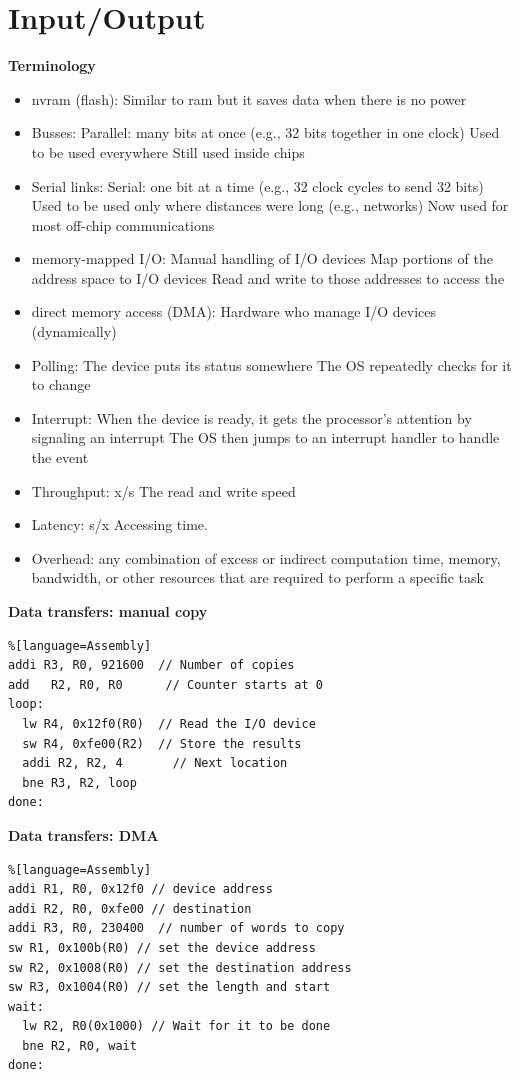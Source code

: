 \newpage
\section{Input/Output}

\textbf{Terminology}
\begin{itemize}
\item  nvram (flash): Similar to ram but it saves data when there is no power
\item  Busses:
  Parallel: many bits at once (e.g., 32 bits together in one clock)
  Used to be used everywhere
  Still used inside chips
\item  Serial links:
  Serial: one bit at a time (e.g., 32 clock cycles to send 32 bits)
  Used to be used only where distances were long (e.g., networks)
  Now used for most off-chip communications
\item  memory-mapped I/O:
  Manual handling of I/O devices
  Map portions of the address space to I/O devices
  Read and write to those addresses to access the 
\item  direct memory access (DMA):
  Hardware who manage I/O devices (dynamically)
\item  Polling:
  The device puts its status somewhere
  The OS repeatedly checks for it to change
\item  Interrupt:
  When the device is ready, it gets the processor’s attention by signaling an interrupt
  The OS then jumps to an interrupt handler to handle the event
\item  Throughput: x/s
  The read and write speed
\item  Latency: s/x
  Accessing time.
\item  Overhead:
  any combination of excess or 
  indirect computation time, memory, bandwidth,
  or other resources that are required to perform a specific task
\end{itemize}



\textbf{Data transfers: manual copy}
\begin{lstlisting}%[language=Assembly]
addi R3, R0, 921600  // Number of copies
add   R2, R0, R0      // Counter starts at 0
loop:
  lw R4, 0x12f0(R0)  // Read the I/O device
  sw R4, 0xfe00(R2)  // Store the results
  addi R2, R2, 4       // Next location
  bne R3, R2, loop
done:
\end{lstlisting}


\textbf{Data transfers: DMA}
\begin{lstlisting}%[language=Assembly]
addi R1, R0, 0x12f0 // device address
addi R2, R0, 0xfe00 // destination
addi R3, R0, 230400  // number of words to copy
sw R1, 0x100b(R0) // set the device address
sw R2, 0x1008(R0) // set the destination address
sw R3, 0x1004(R0) // set the length and start
wait:
  lw R2, R0(0x1000) // Wait for it to be done
  bne R2, R0, wait
done:
\end{lstlisting}


